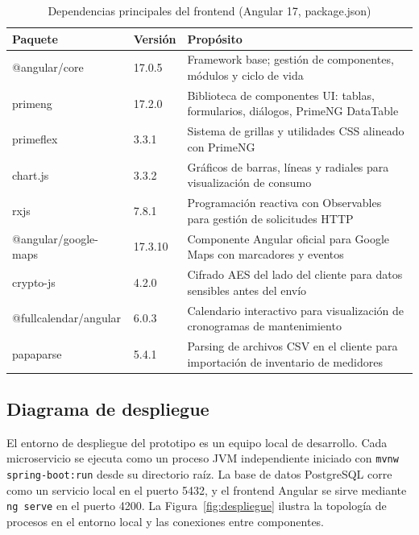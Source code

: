 \documentclass[12pt,a4paper,oneside]{report}
\begin{document}
\begin{table}[H]
\caption{Dependencias principales del frontend (Angular 17, package.json)}\label{tab:deps-frontend}
\centering
\begin{tabularx}{\textwidth}{llX}
\toprule
\textbf{Paquete} & \textbf{Versión} & \textbf{Propósito} \\
\midrule
@angular/core & 17.0.5 & Framework base; gestión de componentes, módulos y ciclo de vida \\
primeng & 17.2.0 & Biblioteca de componentes UI: tablas, formularios, diálogos, PrimeNG DataTable \\
primeflex & 3.3.1 & Sistema de grillas y utilidades CSS alineado con PrimeNG \\
chart.js & 3.3.2 & Gráficos de barras, líneas y radiales para visualización de consumo \\
rxjs & 7.8.1 & Programación reactiva con Observables para gestión de solicitudes HTTP \\
@angular/google-maps & 17.3.10 & Componente Angular oficial para Google Maps con marcadores y eventos \\
crypto-js & 4.2.0 & Cifrado AES del lado del cliente para datos sensibles antes del envío \\
@fullcalendar/angular & 6.0.3 & Calendario interactivo para visualización de cronogramas de mantenimiento \\
papaparse & 5.4.1 & Parsing de archivos CSV en el cliente para importación de inventario de medidores \\
\bottomrule
\end{tabularx}
\end{table}

\subsection{Diagrama de despliegue}\label{subsec:despliegue-diagrama}

El entorno de despliegue del prototipo es un equipo local de desarrollo. Cada microservicio se ejecuta como un proceso JVM independiente iniciado con \texttt{mvnw spring-boot:run} desde su directorio raíz. La base de datos PostgreSQL corre como un servicio local en el puerto 5432, y el frontend Angular se sirve mediante \texttt{ng serve} en el puerto 4200. La Figura~\ref{fig:despliegue} ilustra la topología de procesos en el entorno local y las conexiones entre componentes.
\end{document}
